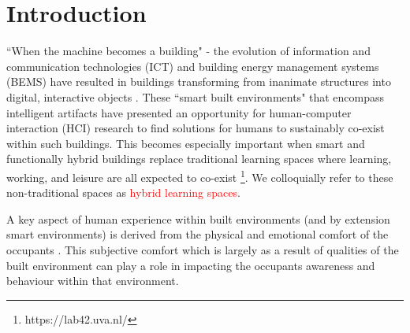 \documentclass[acmconf, anonymous, review]{acmart}
\begin{document}



 
\maketitle

\section{Introduction}
``When the machine becomes a building" - the evolution of information and communication technologies (ICT) and building energy management systems (BEMS) have resulted in buildings transforming from inanimate structures into digital, interactive objects \cite{nembrini2017human}. These ``smart built environments" that encompass intelligent artifacts have presented an opportunity for human-computer interaction (HCI) research to find solutions for humans to sustainably co-exist within such buildings. This becomes especially important when smart and functionally hybrid buildings replace traditional learning spaces where learning, working, and leisure are all expected to co-exist \footnote{https://lab42.uva.nl/}. We colloquially refer to these non-traditional spaces as \textcolor{red}{hybrid learning spaces}. 

A key aspect of human experience within built environments (and by extension smart environments) is derived from the physical and emotional comfort of the occupants \cite{alavi2017comfort}. This subjective comfort which is largely as a result of qualities of the built environment can play a role in impacting the occupants awareness and behaviour within that environment.  
\end{document}
